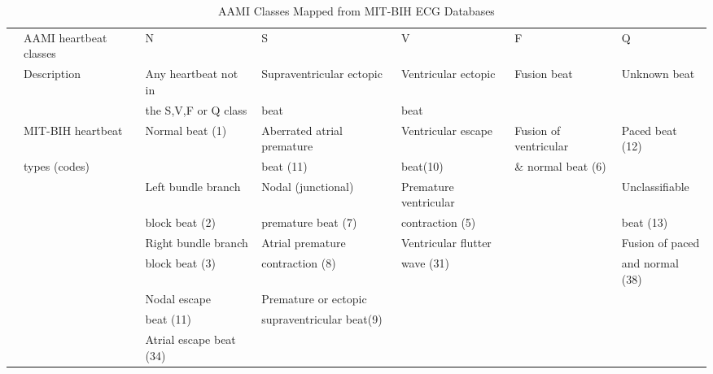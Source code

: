 \documentclass[journal]{IEEEtran}
\begin{document}
\begin{table*}[!htbp]
\begin{center}
\begin{threeparttable}
\caption{AAMI Classes Mapped from MIT-BIH ECG Databases}
\label{table1}
\begin{tabular}{cllllll}
\hline
& AAMI heartbeat classes & N & S & V & F & Q \\
& Description  &Any heartbeat not in & Supraventricular ectopic  & Ventricular ectopic  & Fusion beat & Unknown beat \\
&                     &the S,V,F or Q class & beat   		     & beat	      &	     &          \\
\hline
& MIT-BIH heartbeat  &Normal beat (1)            & Aberrated atrial premature & Ventricular escape & Fusion of ventricular& Paced beat (12)\\
&  types (codes)   &  					  &  beat (11)		    &  beat(10)	            & \& normal beat (6)		      &             \\

&                     &Left bundle branch   &  Nodal (junctional) &Premature ventricular& 	 &  Unclassifiable \\
&                     &block beat (2)            & premature beat (7)    &contraction (5)         &	   & beat (13)   \\

&                     & Right bundle branch & Atrial premature & Ventricular flutter &    &  Fusion of paced  \\
&                     & block beat (3) & contraction (8)     & wave (31) & 	   & and normal (38)  \\

&                     & Nodal escape  & Premature or ectopic & 	     &  &                          \\
&                     & beat (11)	  & supraventricular beat(9) &     &   &     \\

&                     & Atrial escape beat (34)   &  	  				      & 				            & 			      &                          \\

\hline
\end{tabular}

\end{threeparttable}

\end{center}
     \end{table*}
\end{document}

